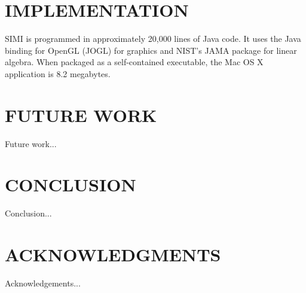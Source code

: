 \documentclass{article}
\begin{document}
\section{IMPLEMENTATION}

SIMI is programmed in approximately 20,000 lines of Java code. It uses
the Java binding for OpenGL (JOGL) for graphics and NIST's JAMA
package for linear algebra. When packaged as a self-contained
executable, the Mac OS X application is 8.2 megabytes.

\section{FUTURE WORK}

Future work...

\section{CONCLUSION}

Conclusion...

\section{ACKNOWLEDGMENTS}


Acknowledgements...


\end{document}
